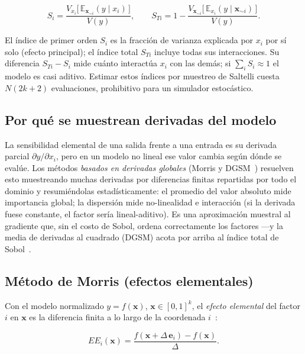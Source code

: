 \documentclass[11pt,a4paper]{article}
\begin{document}
\begin{equation}
S_i = \frac{V_{x_i}\!\bigl[\,\mathbb{E}_{\mathbf{x}_{\sim i}}(y\mid x_i)\,\bigr]}{V(y)},
\qquad
S_{Ti} = 1 - \frac{V_{\mathbf{x}_{\sim i}}\!\bigl[\,\mathbb{E}_{x_i}(y\mid \mathbf{x}_{\sim i})\,\bigr]}{V(y)} .
\label{eq:sobol}
\end{equation}

El índice de primer orden $S_i$ es la fracción de varianza explicada por $x_i$ por
sí solo (efecto principal); el índice total $S_{Ti}$ incluye todas sus
interacciones. Su diferencia $S_{Ti}-S_i$ mide cuánto interactúa $x_i$ con las
demás; si $\sum_i S_i\approx1$ el modelo es casi aditivo. Estimar estos índices por
muestreo de Saltelli cuesta $N(2k+2)$ evaluaciones, prohibitivo para un simulador
estocástico.

\subsection{Por qué se muestrean derivadas del modelo}\label{sec:derivadas}

La sensibilidad elemental de una salida frente a una entrada es su derivada parcial
$\partial y/\partial x_i$, pero en un modelo no lineal ese valor cambia según dónde
se evalúe. Los métodos \emph{basados en derivadas globales} (Morris y
DGSM~\cite{kucherenko2009}) resuelven esto muestreando muchas derivadas por
diferencias finitas repartidas por todo el dominio y resumiéndolas
estadísticamente: el promedio del valor absoluto mide importancia global; la
dispersión mide no-linealidad e interacción (si la derivada fuese constante, el
factor sería lineal-aditivo). Es una aproximación muestral al gradiente que, sin el
costo de Sobol, ordena correctamente los factores —y la media de derivadas al
cuadrado (DGSM) acota por arriba al índice total de Sobol~\cite{kucherenko2009}.

\subsection{Método de Morris (efectos elementales)}\label{sec:morris}

Con el modelo normalizado $y=f(\mathbf{x})$, $\mathbf{x}\in[0,1]^k$, el
\emph{efecto elemental} del factor $i$ en $\mathbf{x}$ es la diferencia finita a lo
largo de la coordenada $i$~\cite{morris1991}:

\begin{equation}
EE_i(\mathbf{x}) = \frac{f(\mathbf{x}+\Delta\,\mathbf{e}_i) - f(\mathbf{x})}{\Delta}.
\label{eq:ee}
\end{equation}
\end{document}
